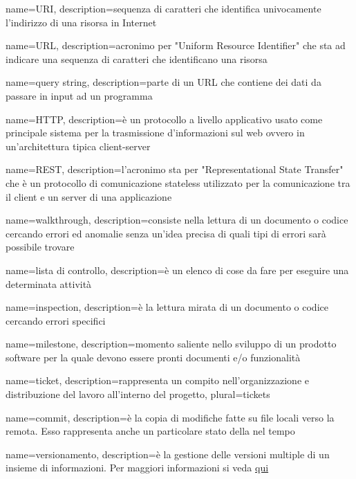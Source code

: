  {
    name=URI,
    description={sequenza di caratteri che identifica univocamente l'indirizzo di una risorsa in Internet}
}

 {
    name=URL,
    description={acronimo per "Uniform Resource Identifier" che sta ad indicare una sequenza di caratteri che identificano una risorsa}
}

 {
    name=query string,
    description={parte di un URL che contiene dei dati da passare in input ad un programma}
}

 {
    name=HTTP,
    description={è un protocollo a livello applicativo usato come principale sistema per la trasmissione d'informazioni sul web ovvero in un'architettura tipica client-server}
}

 {
    name=REST,
    description={l'acronimo sta per "Representational State Transfer" che è un protocollo di comunicazione stateless utilizzato per la comunicazione tra il client e un server di una applicazione}
}

 {
	name=walkthrough,
    description={consiste nella lettura di un documento o codice cercando errori ed anomalie senza un'idea precisa di quali tipi di errori sarà possibile trovare}
}

 {
	name=lista di controllo,
	description={è un elenco di cose da fare per eseguire una determinata attività}
}

 {
	name=inspection,
	description={è la lettura mirata di un documento o codice cercando errori specifici}
}

 {
	name=milestone,
	description={momento saliente nello sviluppo di un prodotto software per la quale devono essere pronti documenti e/o funzionalità}
}

 {
	name=ticket,
	description={rappresenta un compito nell'organizzazione e distribuzione del lavoro all'interno del progetto},
	plural=tickets
}

 {
	name=commit,
	description={è la copia di modifiche fatte su file locali verso la  remota. Esso rappresenta anche un particolare stato della  nel tempo}
}

 {
	name=versionamento,
	description={è la gestione delle versioni multiple di un insieme di informazioni. Per maggiori informazioni si veda \href{http://it. wikipedia.org/wiki/Controllo_versione}{qui}}
}

